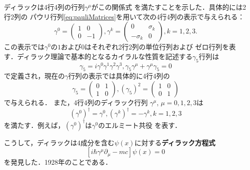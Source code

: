 \documentclass{jsarticle}
\begin{document}
ディラックは4行4列の行列$\gamma^{\mu}$がこの関係式
を満たすことを示した．具体的には2行2列の
パウリ行列\eqref{eq:pauliMatrices}を用いて次の4行4列の表示で与えられる：
\[
\gamma^0 = \begin{pmatrix}
    1 & 0 \\ 0 & -1
\end{pmatrix},
\gamma^k = \begin{pmatrix}
    0 & \sigma_k \\ -\sigma_k & 0
\end{pmatrix},
k=1,2,3.
\]
この表示では$\gamma^0$の$1$および$0$はそれぞれ2行2列の単位行列および
ゼロ行列を表す．ディラック理論で基本的となるカイラルな性質を記述する$\gamma_5$行列は
\[
\gamma_5 = i \gamma^0 \gamma^1 \gamma^2 \gamma^3,
\gamma_5 \gamma^{\mu} + \gamma^{\mu} \gamma_5 = 0
\]
で定義され，現在の$\gamma$行列の表示では具体的に4行4列の
\[
\gamma_5 = \begin{pmatrix}
    0 & 1 \\ 1 & 0
\end{pmatrix},
(\gamma_5)^2 = \begin{pmatrix}
    1 & 0 \\ 0 & 1
\end{pmatrix} 
\]
で与えられる．
また，4行4列のディラック行列
$\gamma^{\mu}$,
$\mu = 0,1,2,3$は
\[
(\gamma^0)^{\dagger} = \gamma^0,
(\gamma^k)^{\dagger} = -\gamma^k,
k=1,2,3
\]
を満たす．例えば，$(\gamma^0)^{\dagger}$は$\gamma^0$のエルミート共役
を表す．

こうして，ディラックは4成分を含む$\psi(x)$に対する\textbf{ディラック方程式}
\begin{equation} \label{eq:diraceq}
    [i\hbar \gamma^{\mu} \partial_{\mu} - mc]\psi(x) = 0
\end{equation}
を発見した．1928年のことである．
\end{document}
